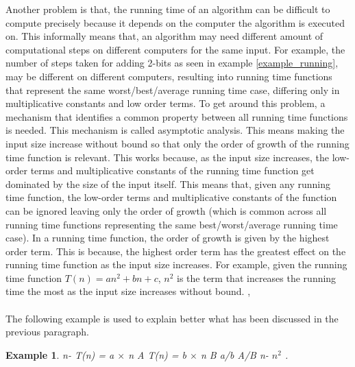 \documentclass[12pt]{article}
\newtheorem{example}[definition]{Example}
\numberwithin{equation}{subsection}
\numberwithin{table}{subsection}
\begin{document}
Another problem is that, the running time of an algorithm can be difficult to compute precisely because it depends on the computer the algorithm is executed on. This informally means that, an algorithm may need different amount of computational steps on different computers for the same input. For example, the number of steps taken for adding 2-bits as seen in example \ref{example_running}, may be different on different computers, resulting into running time functions that represent the same worst/best/average running time case, differing only in multiplicative constants and low order terms. To get around this problem, a mechanism that identifies a common property between all running time functions is needed. This mechanism is called asymptotic analysis. This means making the input size increase without bound so that only the order of growth of the running time function is relevant. This works because, as the input size increases, the low-order terms and multiplicative constants of the running time function get dominated by the size of the input itself. This means that, given any running time function, the low-order terms and multiplicative constants of the function can be ignored leaving only the order of growth (which is common across all running time functions representing the same best/worst/average running time case). In a running time function, the order of growth is given by the highest order term. This is because, the highest order term has the greatest effect on the running time function as the input size increases. For example, given the running time function $\mathit{T(n) = an^2+bn+c}$, $\mathit{n^2}$ is the term that increases the running time the most as the input size increases without bound. \cite{cormen_leiserson_rivest_stein}, \cite{adamchik_2009} \\\\
The following example is used to explain better what has been discussed in the previous paragraph.
\begin{example}
{} n-{} T(n) = a $\times$ n {} A {} T(n) = b $\times$ n {} B {} a/b {} A/B {} n-{} $n^2$ {}. {}
\end{example}
\end{document}
